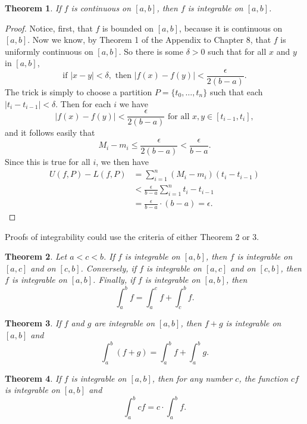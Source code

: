 \documentclass{article}
\numberwithin{corollary}{subsection}
\numberwithin{definition}{subsection}
\numberwithin{lemma}{subsection}
\newtheorem{theorem}{Theorem}
\numberwithin{theorem}{subsection}
\begin{document}
\begin{theorem}
  If $f$ is continuous on $[a, b]$, then $f$ is integrable on $[a, b]$.
\end{theorem}
\begin{proof}
  Notice, first, that $f$ is bounded on $[a, b]$, because it is continuous on
  $[a, b]$. Now we know, by Theorem 1 of the Appendix to Chapter 8, that $f$ is
  uniformly continuous on $[a, b]$. So there is some $\delta > 0$ such that for
  all $x$ and $y$ in $[a, b]$, \[
    \text{if } |x - y| < \delta,
    \text{ then } |f(x) - f(y)| < \frac{\epsilon}{2(b - a)}.
  \] The trick is simply to choose a partition $P = \{t_0, \ldots, t_n\}$ such
  that each $|t_i - t_{i - 1}| < \delta$. Then for each $i$ we have \[
    |f(x) - f(y)|
    < \frac{\epsilon}{2(b - a)} \text{ for all } x, y \in [t_{i - 1}, t_i],
    \] and it follows easily that \[
    M_i - m_i \leq \frac{\epsilon}{2(b - a)} < \frac{\epsilon}{b - a}.
  \] Since this is true for all $i$, we then have
  \begin{align*}
    U(f, P) - L(f, P)
    &= \sum_{i = 1}^n (M_i - m_i)(t_i - t_{i - 1}) \\
    &< \frac{\epsilon}{b - a}\sum_{i = 1}^n t_i - t_{i - 1} \\
    &= \frac{\epsilon}{b - a} \cdot (b - a) = \epsilon.
  \end{align*}
\end{proof}

Proofs of integrability could use the criteria of either Theorem 2 or 3.

\begin{theorem}
  Let $a < c < b$. If $f$ is integrable on $[a, b]$, then $f$ is integrable on
  $[a, c]$ and on $[c, b]$. Conversely, if $f$ is integrable on $[a, c]$ and on
  $[c, b]$, then $f$ is integrable on $[a, b]$. Finally, if $f$ is integrable
  on $[a, b]$, then \[
    \int_a^b f = \int_a^c f + \int_c^b f.
  \]
\end{theorem}

\begin{theorem}
  If $f$ and $g$ are integrable on $[a, b]$, then $f + g$ is integrable on $[a,
  b]$ and \[
    \int_a^b (f + g) = \int_a^b f + \int_a^b g.
  \]
\end{theorem}

\begin{theorem}
  If $f$ is integrable on $[a, b]$, then for any number $c$, the function $cf$
  is integrable on $[a, b]$ and \[
    \int_a^b cf = c \cdot \int_a^b f.
  \]
\end{theorem}
\end{document}
